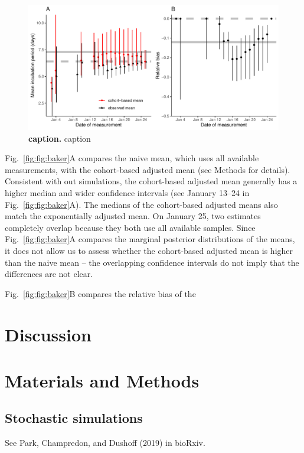 \documentclass[12pt]{article}
\newcommand{\fref}[1]{Fig.~\ref{fig:#1}}
\begin{document}
\begin{figure}[!th]
\includegraphics[width=\textwidth]{figure_baker.pdf}
\caption{
\textbf{caption.}
caption
}
\label{fig:baker}
\end{figure}

\fref{fig:baker}A compares the naive mean, which uses all available measurements, with the cohort-based adjusted mean (see Methods for details).
Consistent with out simulations, the cohort-based adjusted mean generally has a higher median and wider confidence intervals (see January 13--24 in \fref{fig:baker}A).
The medians of the cohort-based adjusted means also match the exponentially adjusted mean.
On January 25, two estimates completely overlap because they both use all available samples.
Since \fref{fig:baker}A compares the marginal posterior distributions of the means, it does not allow us to assess whether the cohort-based adjusted mean is higher than the naive mean -- the overlapping confidence intervals do not imply that the differences are not clear.

\fref{fig:baker}B compares the relative bias of the 


\section{Discussion}



\section{Materials and Methods}

\subsection{Stochastic simulations}

See Park, Champredon, and Dushoff (2019) in bioRxiv.


\end{document}
